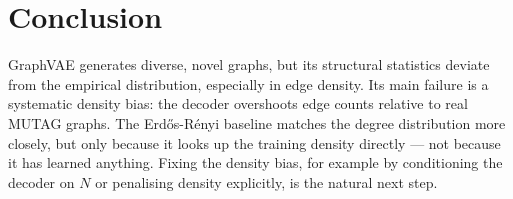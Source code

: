 \section{Conclusion}

GraphVAE generates diverse, novel graphs, but its structural statistics deviate from the empirical distribution, especially in edge density. Its main failure is a systematic density bias: the decoder overshoots edge counts relative to real MUTAG graphs. The Erdős-Rényi baseline matches the degree distribution more closely, but only because it looks up the training density directly --- not because it has learned anything. Fixing the density bias, for example by conditioning the decoder on $N$ or penalising density explicitly, is the natural next step.
